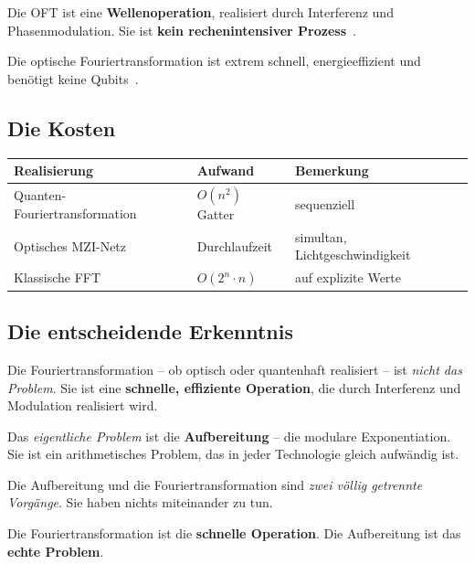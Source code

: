 Die OFT ist eine \textbf{Wellenoperation}, realisiert durch Interferenz
und Phasenmodulation. Sie ist \textbf{kein rechenintensiver
Prozess}~\cite{Wang2022}.

\begin{keyresult}
Die optische Fouriertransformation ist extrem schnell, energieeffizient
und benötigt keine Qubits~\cite{Optica2021, Wang2022}.
\end{keyresult}

\subsection{Die Kosten}

\begin{center}
\begin{tabular}{lll}
\toprule
Realisierung & Aufwand & Bemerkung \\
\midrule
Quanten-Fouriertransformation & $O(n^2)$ Gatter & sequenziell \\
Optisches MZI-Netz & Durchlaufzeit & simultan, Lichtgeschwindigkeit \\
Klassische FFT & $O(2^n \cdot n)$ & auf explizite Werte \\
\bottomrule
\end{tabular}
\end{center}

\subsection{Die entscheidende Erkenntnis}

Die Fouriertransformation -- ob optisch oder quantenhaft realisiert --
ist \emph{nicht das Problem}. Sie ist eine \textbf{schnelle, effiziente
Operation}, die durch Interferenz und Modulation realisiert wird.

Das \emph{eigentliche Problem} ist die \textbf{Aufbereitung} -- die
modulare Exponentiation. Sie ist ein arithmetisches Problem, das in
jeder Technologie gleich aufwändig ist.

\begin{keyresult}
Die Aufbereitung und die Fouriertransformation sind \emph{zwei völlig
getrennte Vorgänge}. Sie haben nichts miteinander zu tun.

Die Fouriertransformation ist die \textbf{schnelle Operation}.
Die Aufbereitung ist das \textbf{echte Problem}.
\end{keyresult}

